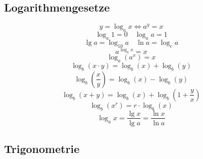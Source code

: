\subsection{Logarithmengesetze}
\[ \boxed{y=\log_ax \Leftrightarrow a^y=x} \]
\[ \boxed{\log_a1=0 \quad \log_aa=1} \]
\[ \boxed{\lg a=\log_{10}a \quad \ln a = \log_ea} \]
\[ \boxed{a^{\log_ax}=x} \]
\[ \boxed{\log_a\left(a^x\right)=x} \]
\[ \boxed{\log_b\left(x \cdot y\right) 
= \log_b\left(x\right) + \log_b\left(y\right)} \]
\[ \boxed{\log_b \left( \frac{x}{y} \right) 
= \log_b\left(x\right) - \log_b\left(y\right)} \]
\[ \boxed{\log_b\left(x + y\right) 
= \log_b\left(x\right) + \log_b\left(1 + \frac{y}{x}\right)} \]
\[ \boxed{\log_b\left(x^r\right) = r \cdot \log_b\left(x\right)} \]
\[ \boxed{\log_ax=\frac{\lg x}{\lg a}=\frac{\ln x}{\ln a}} \]

\newpage
\subsection{Trigonometrie}

